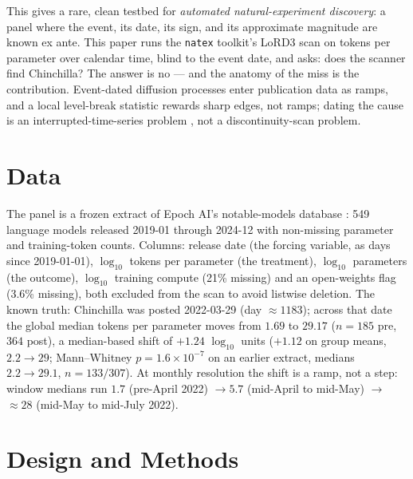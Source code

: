 \documentclass[11pt]{article}
\newcommand{\natex}{\texttt{natex}}
\begin{document}
This gives a rare, clean testbed for \emph{automated natural-experiment
discovery}: a panel where the event, its date, its sign, and its approximate
magnitude are known ex ante. This paper runs the \natex{} toolkit's LoRD3
scan \cite{natex,herlands2018} on tokens per parameter over calendar time,
blind to the event date, and asks: does the scanner find Chinchilla? The
answer is no --- and the anatomy of the miss is the contribution.
Event-dated diffusion processes enter publication data as ramps, and a local
level-break statistic rewards sharp edges, not ramps; dating the cause is an
interrupted-time-series problem \cite{bernal2017}, not a discontinuity-scan
problem.

\section{Data}\label{sec:data}

The panel is a frozen extract of Epoch AI's notable-models database
\cite{epoch2024}: 549 language models released 2019-01 through 2024-12 with
non-missing parameter and training-token counts. Columns: release date (the
forcing variable, as days since 2019-01-01), $\log_{10}$ tokens per
parameter (the treatment), $\log_{10}$ parameters (the outcome), $\log_{10}$
training compute (21\% missing) and an open-weights flag (3.6\% missing),
both excluded from the scan to avoid listwise deletion. The known truth:
Chinchilla was posted 2022-03-29 (day $\approx 1183$); across that date the
global median tokens per parameter moves from $1.69$ to $29.17$ ($n = 185$
pre, $364$ post), a median-based shift of $+1.24$ $\log_{10}$ units
($+1.12$ on group means, $2.2 \to 29$; Mann--Whitney
$p = 1.6 \times 10^{-7}$ on an earlier extract, medians $2.2 \to 29.1$,
$n = 133/307$). At monthly resolution the shift is a ramp, not a step:
window medians run $1.7$ (pre-April 2022) $\to 5.7$ (mid-April to mid-May)
$\to$ ${\approx}28$ (mid-May to mid-July 2022).

\section{Design and Methods}\label{sec:methods}
\end{document}
